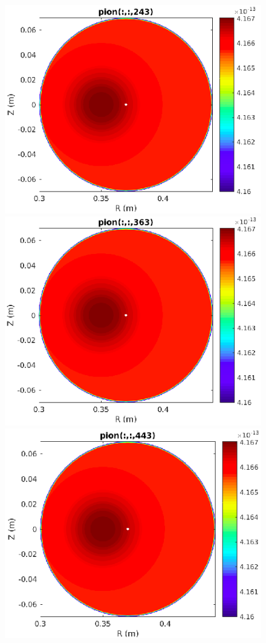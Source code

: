 \documentclass[12pt,oneside,a4paper]{abntex2}
\begin{document}
\begin{figure}[H]
\includegraphics[scale=0.4]{../SImulacao_breakdown/Adaptacao_nova/explicito/i243.png} 
\includegraphics[scale=0.4]{../SImulacao_breakdown/Adaptacao_nova/explicito/i363.png} 
\includegraphics[scale=0.4]{../SImulacao_breakdown/Adaptacao_nova/explicito/i443.png} 

\end{figure}
\end{document}
